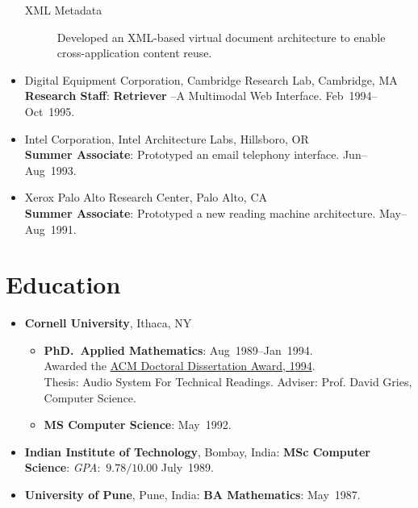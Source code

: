 \documentclass{article}
\begin{document}
\begin{itemize}
\begin{description}
\item[XML Metadata] Developed an XML-based virtual document
  architecture to enable cross-application content reuse.
\end{description}
\item   {Digital Equipment Corporation},  {Cambridge Research Lab}, Cambridge, MA\\
  \textbf{Research Staff}: \textbf{Retriever} --A Multimodal Web
  Interface.  \hfill Feb~1994--Oct~1995.
\item {Intel Corporation}, {Intel Architecture Labs},
  Hillsboro, OR\\
  \textbf{Summer Associate}: Prototyped an email telephony
  interface. \hfill Jun--Aug~1993.
\item {Xerox Palo Alto Research Center}, Palo Alto, CA\\
  \textbf{Summer Associate}: Prototyped a new reading machine
  architecture. \hfill May--Aug~1991.
\end{itemize}

\section*{Education}

\begin{itemize}
\item \textbf{Cornell University}, Ithaca, NY
\begin{itemize}
\item \textbf{PhD.\ Applied Mathematics}: \hfill
  Aug~1989--Jan~1994.\\
  \hspace*{.1in} Awarded the
\href{http://www.acm.org/awards/dd_citation/1994B.html}{%
  ACM Doctoral Dissertation Award, 1994}.\\
\hspace*{.1in} {Thesis}: {Audio System For Technical Readings}.
 {Adviser}: Prof. David Gries, Computer Science.
\item \textbf{MS Computer Science}: \hfill May~1992.
\end{itemize}
\item \textbf{Indian Institute of Technology}, Bombay, India:
  \textbf{MSc Computer Science}: \textit{GPA}:~$9.78/10.00$
  \hfill July~1989.
\item \textbf{University of Pune}, Pune, India: \textbf{BA
    Mathematics}: \hfill May~1987.
\end{itemize}

\end{document}

